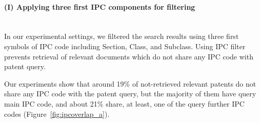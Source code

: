 \paragraph{(I) Applying three first IPC components for filtering}
\ \\
In our experimental settings, we filtered the search results using three first symbols of IPC code including Section, Class, and Subclass. Using IPC filter prevents retrieval of relevant documents which do not share any IPC code with patent query. 

Our experiments show that   
around 19\% of not-retrieved relevant patents do not share any IPC code with the patent query, but the majority of them have query main IPC code, and about 21\% share, at least, one of the query further IPC codes (Figure~\ref{fig:ipcoverlap_a}). 
